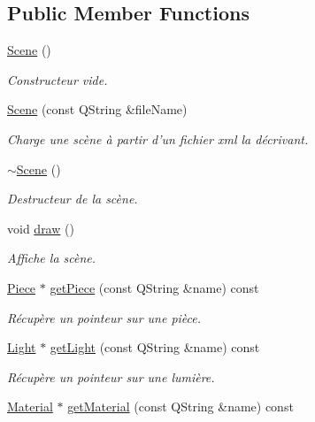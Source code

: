 \subsection*{Public Member Functions}
\begin{DoxyCompactItemize}
\item 
\hyperlink{class_scene_ad10176d75a9cc0da56626f682d083507}{Scene} ()
\begin{DoxyCompactList}\small\item\em Constructeur vide. \end{DoxyCompactList}\item 
\hyperlink{class_scene_a31c9409af2f7f8f592519eb4a3029624}{Scene} (const Q\+String \&file\+Name)
\begin{DoxyCompactList}\small\item\em Charge une scène à partir d'un fichier xml la décrivant. \end{DoxyCompactList}\item 
\hyperlink{class_scene_a3b8cec2e32546713915f8c6303c951f1}{$\sim$\+Scene} ()
\begin{DoxyCompactList}\small\item\em Destructeur de la scène. \end{DoxyCompactList}\item 
void \hyperlink{class_scene_ac0e3d2c98ba6063a086467fb2c19142f}{draw} ()
\begin{DoxyCompactList}\small\item\em Affiche la scène. \end{DoxyCompactList}\item 
\hyperlink{class_piece}{Piece} $\ast$ \hyperlink{class_scene_ae2060bd6c44231ffe7f6f0a3447325f1}{get\+Piece} (const Q\+String \&name) const 
\begin{DoxyCompactList}\small\item\em Récupère un pointeur sur une pièce. \end{DoxyCompactList}\item 
\hyperlink{class_light}{Light} $\ast$ \hyperlink{class_scene_a4f35ca9d308ef5563d9f205904eedbb8}{get\+Light} (const Q\+String \&name) const 
\begin{DoxyCompactList}\small\item\em Récupère un pointeur sur une lumière. \end{DoxyCompactList}\item 
\hyperlink{class_material}{Material} $\ast$ \hyperlink{class_scene_afb93862254b6869533d7487c56133adb}{get\+Material} (const Q\+String \&name) const 

\end{DoxyCompactItemize}
